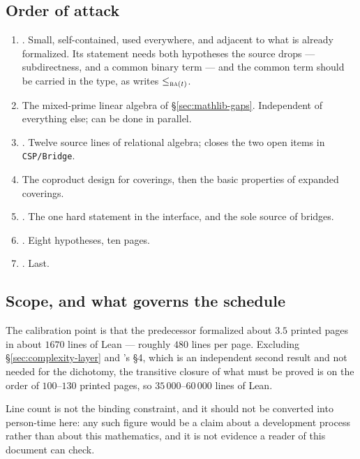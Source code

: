 \subsection{Order of attack}\label{sec:order}

\begin{enumerate}\tightlist
\item {}. Small, self-contained, used everywhere,
  and adjacent to what is already formalized. Its statement needs both
  hypotheses the source drops --- subdirectness, and a common binary term ---
  and the common term should be carried in the type, as \cite{ZhukStrong}
  writes $\le_{\textup{\textsc{ba}}(t)}$.
\item The mixed-prime linear algebra of \S\ref{sec:mathlib-gaps}. Independent
  of everything else; can be done in parallel.
\item {}. Twelve source lines of relational algebra;
  closes the two open items in \texttt{CSP/Bridge}.
\item The coproduct design for coverings, then the basic properties of expanded
  coverings.
\item {}. The one hard statement in the
  interface, and the sole source of bridges.
\item {}. Eight hypotheses, ten pages.
\item {}. Last.
\end{enumerate}

\subsection{Scope, and what governs the schedule}\label{sec:scope}

The calibration point is that the predecessor formalized about $3.5$ printed
pages in about $1670$ lines of Lean --- roughly $480$ lines per page. Excluding
\S\ref{sec:complexity-layer} and \cite{ZhukSimplified}'s \S4, which is an
independent second result and not needed for the dichotomy, the transitive
closure of what must be proved is on the order of $100$--$130$ printed pages,
so $35\,000$--$60\,000$ lines of Lean.

Line count is not the binding constraint, and it should not be converted into
person-time here: any such figure would be a claim about a development process
rather than about this mathematics, and it is not evidence a reader of this
document can check.

